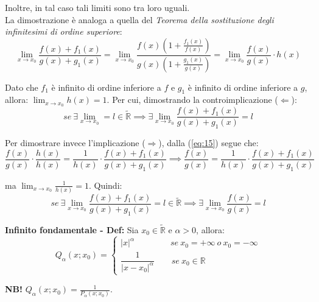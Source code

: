\documentclass{article}
\begin{document}
\noindent Inoltre, in tal caso tali limiti sono tra loro uguali.\\

\noindent La dimostrazione è analoga a quella del \textit{Teorema della sostituzione degli infinitesimi di ordine superiore}:
\begin{equation}
    \lim_{x \to x_0} \frac{f(x) + f_1(x)}{g(x) + g_1(x)} = \lim_{x \to x_0} \frac{f(x) \left(1 + \frac{f_1(x)}{f(x)}\right)}{g(x) \left(1 + \frac{g_1(x)}{g(x)}\right)} = \lim_{x \to x_0} \frac{f(x)}{g(x)} \cdot h(x)
    \label{eq:15}
\end{equation}

\noindent Dato che $f_1$ è infinito di ordine inferiore a $f$ e $g_1$ è infinito di ordine inferiore a $g$, allora: $\lim_{x \to x_0} h(x) = 1$. Per cui, dimostrando la controimplicazione ($\Leftarrow$):
\begin{equation*}
    se \ \exists \lim_{x \to x_0} = l \in \widetilde{\mathbb{R}} \implies \exists \lim_{x \to x_0} \frac{f(x) + f_1(x)}{g(x) + g_1(x)} = l
\end{equation*}

\noindent Per dimostrare invece l'implicazione ($\Rightarrow$), dalla (\ref{eq:15}) segue che:
\begin{equation*}
    \frac{f(x)}{g(x)} \cdot \frac{h(x)}{h(x)} = \frac{1}{h(x)} \cdot \frac{f(x) + f_1(x)}{g(x) + g_1(x)} \implies \frac{f(x)}{g(x)} = \frac{1}{h(x)} \cdot \frac{f(x) + f_1(x)}{g(x) + g_1(x)}
\end{equation*}

\noindent ma $\lim_{x \to x_0} \frac{1}{h(x)} = 1$. Quindi: 
\begin{equation*}
    se \ \exists \lim_{x \to x_0} \frac{f(x) + f_1(x)}{g(x) + g_1(x)} = l \in \widetilde{\mathbb{R}} \implies \exists \lim_{x \to x_0} \frac{f(x)}{g(x)} = l
\end{equation*}

\noindent\textbf{Infinito fondamentale - Def:} Sia $x_0 \in \widetilde{\mathbb{R}}$ e $\alpha > 0$, allora:
\begin{equation*}
     Q_\alpha(x; x_0) = \begin{cases}
        |x|^\alpha \qquad \qquad \ se \ x_0 = +\infty \ o \ x_0 = -\infty\\
        \dfrac{1}{|x - x_0|^\alpha} \qquad se \ x_0 \in \mathbb{R}
    \end{cases}
\end{equation*}

\noindent\textbf{NB!} $Q_\alpha(x; x_0) = \frac{1}{P_\alpha(x; x_0)}$.\\
\end{document}

